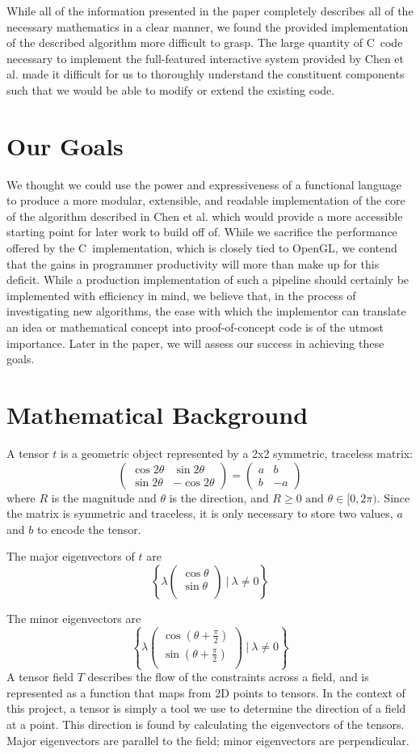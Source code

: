 \documentclass[twocolumn]{article}
\newcommand{\sqmat}[4]{\ensuremath{
    \left(\begin{array}{cc}
        #1 & #2 \\
        #3 & #4
    \end{array}\right)}}
\newcommand{\mkvec}[2]{\ensuremath{
    \left(\begin{array}{c}
        #1 \\
        #2 \\
    \end{array}\right)}}
\def \cpp {C\nolinebreak[4]\hspace{-.05em}\raisebox{.4ex}{\tiny\bf ++}~}
\begin{document}
While all of the information presented in the paper completely describes all of
the necessary mathematics in a clear manner,
we found the provided implementation of the described
algorithm more difficult to grasp. The large quantity of \cpp code necessary to
implement the full-featured interactive system provided by Chen et al. made it
difficult for us to thoroughly understand the constituent components such that
we would be able to modify or extend the existing code.

\section{Our Goals}
We thought we could use the power and expressiveness of a functional language
to produce a more modular, extensible, and readable implementation of the core
of the algorithm described in Chen et al. which would provide a more
accessible starting point for later work to build off of. While we sacrifice
the performance offered by the \cpp implementation, which is closely tied to
OpenGL, we contend that the gains in programmer productivity will more than
make up for this deficit. While a production implementation of such a pipeline
should certainly be implemented with efficiency in mind, we believe that, in
the process of investigating new algorithms, the ease with which the
implementor can translate an idea or mathematical concept into proof-of-concept
code is of the utmost importance. Later in the paper, we will assess our
success in achieving these goals.

\section{Mathematical Background}
\label{sec:math}
A tensor $t$ is a geometric object represented by a 2x2 symmetric, traceless
matrix:
\[
    \sqmat{\cos{2\theta}}{\sin{2\theta}}{\sin{2\theta}}{-\cos{2\theta}}
    = \sqmat{a}{b}{b}{-a}
\]
where $R$ is the magnitude and $\theta$ is the direction, and
$R\geq0 \textrm{ and } \theta\in[0,2\pi)$. Since the matrix is symmetric and
traceless, it is only necessary to store two values, $a$ and $b$ to encode
the tensor.

The major eigenvectors of $t$ are
\[
    \left\{
        \lambda\mkvec{\cos{\theta}}{\sin{\theta}} ~|~ \lambda \neq 0
    \right\}
\]

The minor eigenvectors are
\[
    \left\{
        \lambda\mkvec
                {\cos{(\theta+\frac{\pi}{2})}}
                {\sin{(\theta+\frac{\pi}{2})}}
        ~|~ \lambda \neq 0
    \right\}
\]
A tensor field $T$ describes the flow of the constraints across a field,
and is represented as a function that maps from 2D points to tensors. In the
context of this project, a tensor is simply a tool we use to determine the
direction of a field at a point. This direction is found by calculating the
eigenvectors of the tensors. Major eigenvectors are parallel to the field;
minor eigenvectors are perpendicular.
\end{document}
